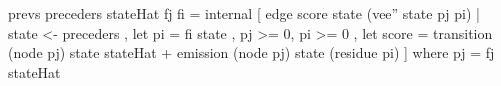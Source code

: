 prevs preceders stateHat fj fi =
 internal [ edge score state (vee'' state pj pi)
          | state <- preceders
          , let pi = fi state
          , pj >= 0, pi >= 0
          , let score = transition (node pj) state stateHat
                        + emission (node pj) state (residue pi)
          ]
 where pj = fj stateHat
